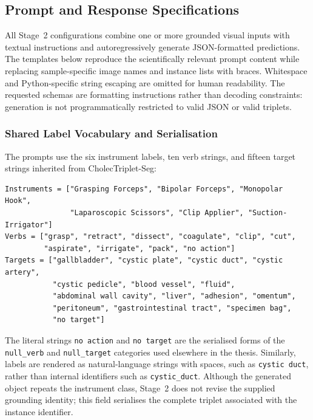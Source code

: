 \ifcFiveSupplement
\subsection{Prompt and Response Specifications}
\label{sec:c5:appendix-prompts}

All Stage~2 configurations combine one or more grounded visual inputs with textual instructions and autoregressively generate JSON-formatted predictions. The templates below reproduce the scientifically relevant prompt content while replacing sample-specific image names and instance lists with braces. Whitespace and Python-specific string escaping are omitted for human readability. The requested schemas are formatting instructions rather than decoding constraints: generation is not programmatically restricted to valid JSON or valid triplets.

\subsubsection{Shared Label Vocabulary and Serialisation}

The prompts use the six instrument labels, ten verb strings, and fifteen target strings inherited from CholecTriplet-Seg:

\begin{lstlisting}[style=c5prompt]
Instruments = ["Grasping Forceps", "Bipolar Forceps", "Monopolar Hook",
               "Laparoscopic Scissors", "Clip Applier", "Suction-Irrigator"]
Verbs = ["grasp", "retract", "dissect", "coagulate", "clip", "cut",
         "aspirate", "irrigate", "pack", "no action"]
Targets = ["gallbladder", "cystic plate", "cystic duct", "cystic artery",
           "cystic pedicle", "blood vessel", "fluid",
           "abdominal wall cavity", "liver", "adhesion", "omentum",
           "peritoneum", "gastrointestinal tract", "specimen bag",
           "no target"]
\end{lstlisting}

The literal strings \texttt{no action} and \texttt{no target} are the serialised forms of the \texttt{null\_verb} and \texttt{null\_target} categories used elsewhere in the thesis. Similarly, labels are rendered as natural-language strings with spaces, such as \texttt{cystic duct}, rather than internal identifiers such as \texttt{cystic\_duct}. Although the generated object repeats the instrument class, Stage~2 does not revise the supplied grounding identity; this field serialises the complete triplet associated with the instance identifier.

